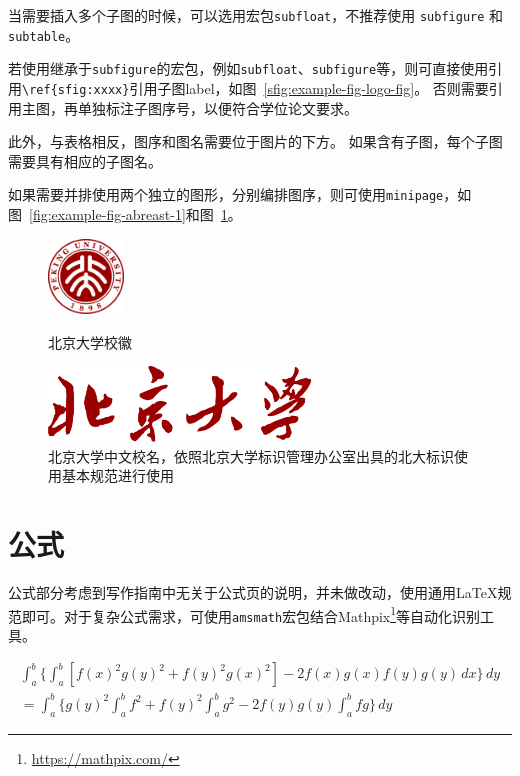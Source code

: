 当需要插入多个子图的时候，可以选用宏包\verb|subfloat|，不推荐使用
\verb|subfigure| 和 \verb|subtable|。

若使用继承于\verb|subfigure|的宏包，例如\verb|subfloat|、\verb|subfigure|等，则可直接使用引用\verb|\ref{sfig:xxxx}|引用子图label，如图~\ref{sfig:example-fig-logo-fig}。
否则需要引用主图，再单独标注子图序号，以便符合学位论文要求。

此外，与表格相反，图序和图名需要位于图片的下方。
如果含有子图，每个子图需要具有相应的子图名。


如果需要并排使用两个独立的图形，分别编排图序，则可使用\verb|minipage|，如图~\ref{fig:example-fig-abreast-1}和图~\ref{fig:example-fig-abreast-2}。

\begin{figure}[htb]
\begin{minipage}{0.48\textwidth}
  \centering
  \includegraphics[height=2cm]{img/pku-fig-logo}
  \caption{北京大学校徽}
  \label{fig:example-fig-abreast-1}
\end{minipage}\hfill
\begin{minipage}{0.48\textwidth}
  \centering
  \includegraphics[height=2cm]{img/pku-text-logo}
  \caption{北京大学中文校名，依照北京大学标识管理办公室出具的北大标识使用基本规范进行使用}
  \label{fig:example-fig-abreast-2}
\end{minipage}
\end{figure}

\section{公式}
\label{sec:equation}

公式部分考虑到写作指南中无关于公式页的说明，并未做改动，使用通用\LaTeX{}规范即可。对于复杂公式需求，可使用\verb|amsmath|宏包结合Mathpix\footnote{\url{https://mathpix.com/}}等自动化识别工具。

\begin{multline*}
\int_a^b\biggl\{\int_a^b[f(x)^2g(y)^2+f(y)^2g(x)^2]
 -2f(x)g(x)f(y)g(y)\,dx\biggr\}\,dy \\
 =\int_a^b\biggl\{g(y)^2\int_a^bf^2+f(y)^2
  \int_a^b g^2-2f(y)g(y)\int_a^b fg\biggr\}\,dy
\end{multline*}

